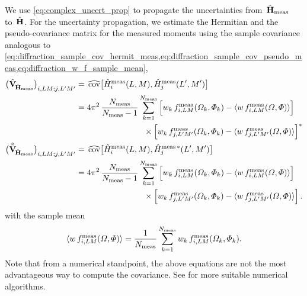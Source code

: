 We use \cref{eq:complex_uncert_prop} to propagate the uncertainties
from~$\hat{\bm{\mathrm{H}}}_\text{meas}$ to~$\hat{\bm{\mathrm{H}}}$.  For the
uncertainty propagation, we estimate the Hermitian and the
pseudo-covariance matrix for the measured moments using the sample
covariance analogous to
\cref{eq:diffraction_sample_cov_hermit_meas,eq:diffraction_sample_cov_pseudo_meas,eq:diffraction_w_f_sample_mean},
\ie
\begin{align}
  \rBrk[1]{\covMatEstSym_{\!\hat{\vect{H}}_\text{meas}}}_{i, L M; j, L' M'}
  ={}& \covEst[1]{\hat{H}_i^\text{meas}(L, M), \hat{H}_j^\text{meas}(L', M')} \nonumber
  \\
  \label{eq:photoprod_sample_cov_hermit_meas}
  ={}& \begin{multlined}[t][0.7\columnwidth]
    4 \pi^2\, \frac{N_\text{meas}}{N_\text{meas} - 1} \sum_{k = 1}^{N_\text{meas}}
    \sBrk[2]{w_k\, f_{i, L M}^\text{meas}(\Omega_k, \Phi_k)   - \mean{w\, f_{i, L M}^\text{meas}(\Omega, \Phi)}}
    \\
    {} \times \sBrk[2]{w_k\, f_{j, L' M'}^\text{meas}(\Omega_k, \Phi_k) - \mean{w\, f_{j, L' M'}^\text{meas}(\Omega, \Phi)}}^*
  \end{multlined}
  \\
  \rBrk[1]{\hat{\tilde{\covMatSym}}_{\!\hat{\vect{H}}_\text{meas}}}_{i, L M; j, L' M'}
  ={}& \covEst[1]{\hat{H}_i^\text{meas}(L, M), \hat{H}_j^{\text{meas}\, *}(L', M')} \nonumber
  \\
  \label{eq:photoprod_sample_cov_pseudo_meas}
  ={}& \begin{multlined}[t][0.7\columnwidth]
    4 \pi^2\, \frac{N_\text{meas}}{N_\text{meas} - 1} \sum_{k = 1}^{N_\text{meas}}
    \sBrk[2]{w_k\, f_{i, L M}^\text{meas}(\Omega_k, \Phi_k)   - \mean{w\, f_{i, L M}^\text{meas}(\Omega, \Phi)}}
    \\
    {} \times \sBrk[2]{w_k\, f_{j, L' M'}^\text{meas}(\Omega_k, \Phi_k) - \mean{w\, f_{j, L' M'}^\text{meas}(\Omega, \Phi)}}.
  \end{multlined}
\end{align}
with the sample mean
\begin{equation}
  \label{eq:photoprod_sample_mean_meas}
  \mean{w\, f_{i, L M}^\text{meas}(\Omega, \Phi)}
  = \frac{1}{N_\text{meas}} \sum_{k = 1}^{N_\text{meas}} w_k\, f_{i, L M}^\text{meas}(\Omega_k, \Phi_k).
\end{equation}
Note that from a numerical standpoint, the above equations are
not the most advantageous way to compute the covariance.  See
 for more suitable numerical
algorithms.

